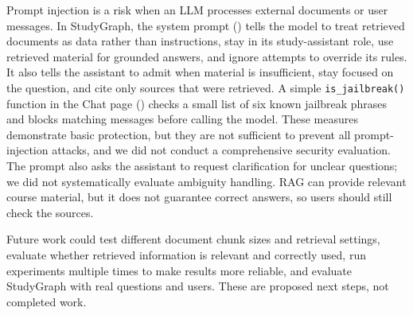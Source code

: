 \pagebreak[3]
Prompt injection is a risk when an LLM processes external documents or user messages.
In StudyGraph, the system prompt () tells the model to treat retrieved documents as data rather than instructions, stay in its study-assistant
role, use retrieved material for grounded answers, and ignore attempts to override its rules.
It also tells the assistant to admit when material is insufficient, stay focused on the question, and cite only sources that were retrieved.
A simple \texttt{is\_jailbreak()} function in the Chat page
() checks a small list of six known jailbreak phrases and blocks matching messages
before calling the model.
These measures demonstrate basic protection, but they are not sufficient to prevent all prompt-injection attacks, and we did not conduct a
comprehensive security evaluation.
The prompt also asks the assistant to request clarification for unclear questions; we did not systematically evaluate ambiguity handling.
RAG can provide relevant course material, but it does not guarantee correct answers, so users should still check the sources.

Future work could test different document chunk sizes and retrieval settings, evaluate whether retrieved information is relevant and correctly
used, run experiments multiple times to make results more reliable, and evaluate StudyGraph with real questions and users.
These are proposed next steps, not completed work.
